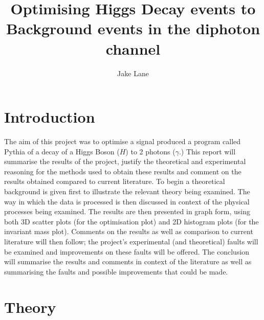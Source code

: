 \documentclass{article}
\author{Jake Lane}
\title{Optimising Higgs Decay events to Background events in the diphoton channel}
\begin{document}
\maketitle
\begin{abstract}
\end{abstract}
\section{Introduction}
The aim of this project was to optimise a signal produced a program called Pythia of a decay of a Higgs Boson ($H$) to 2 photons ($\gamma$.) This report will summarise the results of the project, justify the theoretical and experimental reasoning for the methods used to obtain these results and comment on the results obtained compared to current literature. To begin a theoretical background is given first to illustrate the relevant theory being examined. The way in which the data is processed is then discussed in context of the physical processes being examined. The results are then presented in graph form, using both 3D scatter plots (for the optimisation plot) and 2D histogram plots (for the invariant mass plot). Comments on the results as well as comparison to current literature will then follow; the project's experimental (and theoretical) faults will be examined and improvements on these faults will be offered. The conclusion will summarise the results and comments in context of the literature as well as summarising the faults and possible improvements that could be made.  
\section{Theory}
\end{document}
